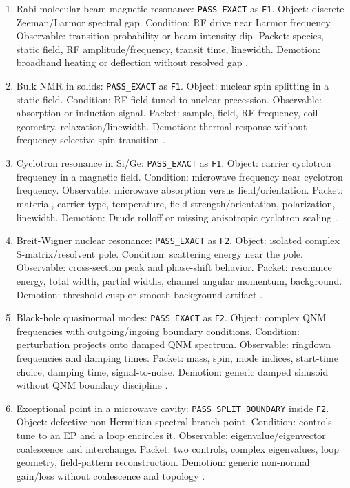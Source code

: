 \documentclass[aps,pra,reprint,nofootinbib]{revtex4-2}
\begin{document}
\begin{enumerate}
\item Rabi molecular-beam magnetic resonance: \texttt{PASS\_EXACT} as \texttt{F1}. Object: discrete Zeeman/Larmor spectral gap. Condition: RF drive near Larmor frequency. Observable: transition probability or beam-intensity dip. Packet: species, static field, RF amplitude/frequency, transit time, linewidth. Demotion: broadband heating or deflection without resolved gap \cite{rabi1938space}.
\item Bulk NMR in solids: \texttt{PASS\_EXACT} as \texttt{F1}. Object: nuclear spin splitting in a static field. Condition: RF field tuned to nuclear precession. Observable: absorption or induction signal. Packet: sample, field, RF frequency, coil geometry, relaxation/linewidth. Demotion: thermal response without frequency-selective spin transition \cite{purcell1946resonance}.
\item Cyclotron resonance in Si/Ge: \texttt{PASS\_EXACT} as \texttt{F1}. Object: carrier cyclotron frequency in a magnetic field. Condition: microwave frequency near cyclotron frequency. Observable: microwave absorption versus field/orientation. Packet: material, carrier type, temperature, field strength/orientation, polarization, linewidth. Demotion: Drude rolloff or missing anisotropic cyclotron scaling \cite{dresselhaus1955cyclotron}.
\item Breit-Wigner nuclear resonance: \texttt{PASS\_EXACT} as \texttt{F2}. Object: isolated complex S-matrix/resolvent pole. Condition: scattering energy near the pole. Observable: cross-section peak and phase-shift behavior. Packet: resonance energy, total width, partial widths, channel angular momentum, background. Demotion: threshold cusp or smooth background artifact \cite{wigner1946resonance}.
\item Black-hole quasinormal modes: \texttt{PASS\_EXACT} as \texttt{F2}. Object: complex QNM frequencies with outgoing/ingoing boundary conditions. Condition: perturbation projects onto damped QNM spectrum. Observable: ringdown frequencies and damping times. Packet: mass, spin, mode indices, start-time choice, damping time, signal-to-noise. Demotion: generic damped sinusoid without QNM boundary discipline \cite{maggiore2008physical}.
\item Exceptional point in a microwave cavity: \texttt{PASS\_SPLIT\_BOUNDARY} inside \texttt{F2}. Object: defective non-Hermitian spectral branch point. Condition: controls tune to an EP and a loop encircles it. Observable: eigenvalue/eigenvector coalescence and interchange. Packet: two controls, complex eigenvalues, loop geometry, field-pattern reconstruction. Demotion: generic non-normal gain/loss without coalescence and topology \cite{dembowski2001experimental}.

\end{enumerate}
\end{document}
